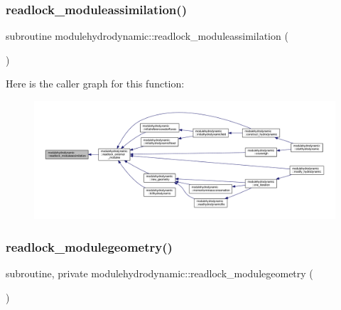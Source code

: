 \subsubsection{\texorpdfstring{readlock\+\_\+moduleassimilation()}{readlock\_moduleassimilation()}}
{\footnotesize\ttfamily subroutine modulehydrodynamic\+::readlock\+\_\+moduleassimilation (\begin{DoxyParamCaption}{ }\end{DoxyParamCaption})\hspace{0.3cm}{\ttfamily [private]}}

Here is the caller graph for this function\+:\nopagebreak
\begin{figure}[H]
\begin{center}
\leavevmode
\includegraphics[width=350pt]{namespacemodulehydrodynamic_ab5bfdd9c743fefaf135fd907892e5f17_icgraph}
\end{center}
\end{figure}
\mbox{\label{namespacemodulehydrodynamic_a1a5e2244778fa6a2caa0ff13ec7eb67b}} 
\subsubsection{\texorpdfstring{readlock\+\_\+modulegeometry()}{readlock\_modulegeometry()}}
{\footnotesize\ttfamily subroutine, private modulehydrodynamic\+::readlock\+\_\+modulegeometry (\begin{DoxyParamCaption}{ }\end{DoxyParamCaption})\hspace{0.3cm}{\ttfamily [private]}}

